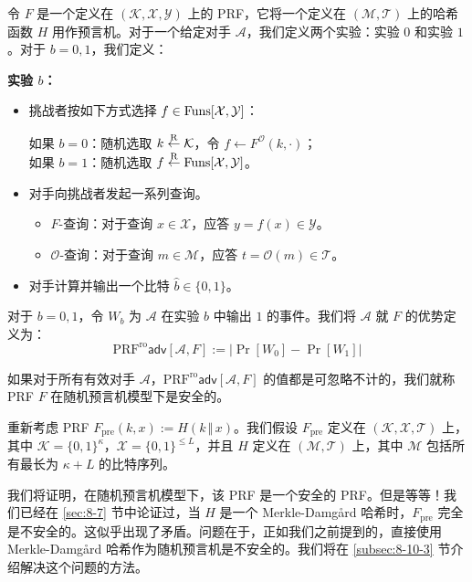 \begin{game}\label{game:8-4}
令 $F$ 是一个定义在 $(\mathcal{K},\mathcal{X},\mathcal{Y})$ 上的 PRF，它将一个定义在 $(\mathcal{M},\mathcal{T})$ 上的哈希函数 $H$ 用作预言机。对于一个给定对手 $\mathcal{A}$，我们定义两个实验：实验 $0$ 和实验 $1$。对于 $b=0,1$，我们定义：

\noindent\textbf{实验 $b$：}
\begin{itemize}
	\item 挑战者按如下方式选择 $f\in{\rm Funs}[\mathcal{X},\mathcal{Y}]$：
	
	\hspace*{26pt} 如果 $b=0$：随机选取 $k\overset{\rm R}\leftarrow\mathcal{K}$，令 $f\leftarrow F^\mathcal{O}(k,\cdot)$；\\
	\hspace*{26pt} 如果 $b=1$：随机选取 $f\overset{\rm R}\leftarrow{\rm Funs}[\mathcal{X},\mathcal{Y}]$。
	
	\item 对手向挑战者发起一系列查询。
	\begin{itemize}
		\item $F$-查询：对于查询 $x\in\mathcal{X}$，应答 $y=f(x)\in\mathcal{Y}$。
		\item $\mathcal{O}$-查询：对于查询 $m\in\mathcal{M}$，应答 $t=\mathcal{O}(m)\in\mathcal{T}$。
	\end{itemize}
	\item 对手计算并输出一个比特 $\hat b\in\{0,1\}$。
\end{itemize}
对于 $b=0,1$，令 $W_b$ 为 $\mathcal{A}$ 在实验 $b$ 中输出 $1$ 的事件。我们将 $\mathcal{A}$ 就 $F$ 的优势定义为：
\[
\mathrm{PRF}^\mathrm{ro}\mathsf{adv}[\mathcal{A},F]:=
\big\lvert
\Pr[W_0]-\Pr[W_1]
\big\rvert
\]
\end{game}

\begin{definition}\label{def:8-5}
如果对于所有有效对手 $\mathcal{A}$，$\mathrm{PRF}^\mathrm{ro}\mathsf{adv}[\mathcal{A},F]$ 的值都是可忽略不计的，我们就称 PRF $F$ 在随机预言机模型下是安全的。
\end{definition}

重新考虑 PRF $F_\mathrm{pre}(k,x):=H(k\,\Vert\,x)$。我们假设 $F_\mathrm{pre}$ 定义在 $(\mathcal{K},\mathcal{X},\mathcal{T})$ 上，其中 $\mathcal{K}=\{0,1\}^\kappa$，$\mathcal{X}=\{0,1\}^{\leq L}$，并且 $H$ 定义在 $(\mathcal{M},\mathcal{T})$ 上，其中 $\mathcal{M}$ 包括所有最长为 $\kappa+L$ 的比特序列。

我们将证明，在随机预言机模型下，该 PRF 是一个安全的 PRF。但是等等！我们已经在 \ref{sec:8-7} 节中论证过，当 $H$ 是一个 Merkle-Damg{\aa}rd 哈希时，$F_\mathrm{pre}$ 完全是不安全的。这似乎出现了矛盾。问题在于，正如我们之前提到的，直接使用 Merkle-Damg{\aa}rd 哈希作为随机预言机是不安全的。我们将在 \ref{subsec:8-10-3} 节介绍解决这个问题的方法。

